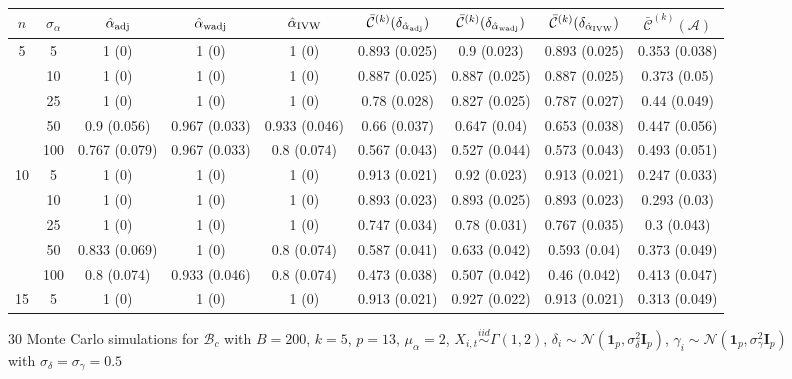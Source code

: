 \documentclass[10pt]{article}
\newcommand{\simiid}{\stackrel{iid}{\sim}} %
\def\normal#1#2{\mathcal{N}(#1,#2)} %
\def\mc#1{\mathcal{#1}} %
\theoremstyle{definition}
\begin{document}


\begin{sidewaysfigure}
\centering
\caption{30 Monte Carlo simulations for $\mc{B}_c$ with $B = 200$, $k = 5$, $p = 13$, $\mu_{\alpha}=2$, $X_{i,t} \simiid \Gamma(1,2)$, $\delta_i \sim \normal{\mathbf{1}_p}{\sigma^2_{\delta}\mathbf{I}_p}$, $\gamma_i \sim \normal{\mathbf{1}_p}{\sigma^2_{\gamma}\mathbf{I}_p}$ with $\sigma_{\delta}=\sigma_{\gamma}=0.5$}
\begin{tabular}{cc|ccc|cccc}
 $n$   & $\sigma_{\alpha}$ &  $\hat{\alpha}_{\rm adj}$  & $\hat{\alpha}_{\rm wadj}$ & $\hat{\alpha}_{\rm IVW}$  & $\bar{\mc{C}}^{(k)}(\delta_{\hat{\alpha}_{\rm adj}})$  & $\bar{\mc{C}}^{(k)}(\delta_{\hat{\alpha}_{\rm wadj}})$ & $\bar{\mc{C}}^{(k)}(\delta_{\hat{\alpha}_{\rm IVW}})$ &  $\bar{\mc{C}}^{(k)}(\mc{A})$ \\[.3cm]  
  \hline
  \multirow{5}{*}{5} & 5  & 1 (0) & 1 (0) & 1 (0) & 0.893 (0.025) & 0.9 (0.023) & 0.893 (0.025) & 0.353 (0.038) \\ 
  & 10  & 1 (0) & 1 (0) & 1 (0) & 0.887 (0.025) & 0.887 (0.025) & 0.887 (0.025) & 0.373 (0.05) \\ 
  & 25  & 1 (0) & 1 (0) & 1 (0) & 0.78 (0.028) & 0.827 (0.025) & 0.787 (0.027) & 0.44 (0.049) \\ 
  & 50  & 0.9 (0.056) & 0.967 (0.033) & 0.933 (0.046) & 0.66 (0.037) & 0.647 (0.04) & 0.653 (0.038) & 0.447 (0.056) \\ 
  & 100  & 0.767 (0.079) & 0.967 (0.033) & 0.8 (0.074) & 0.567 (0.043) & 0.527 (0.044) & 0.573 (0.043) & 0.493 (0.051) \\[.3cm]  
  \multirow{5}{*}{10} & 5  & 1 (0) & 1 (0) & 1 (0) & 0.913 (0.021) & 0.92 (0.023) & 0.913 (0.021) & 0.247 (0.033) \\ 
  & 10  & 1 (0) & 1 (0) & 1 (0) & 0.893 (0.023) & 0.893 (0.025) & 0.893 (0.023) & 0.293 (0.03) \\ 
  & 25  & 1 (0) & 1 (0) & 1 (0) & 0.747 (0.034) & 0.78 (0.031) & 0.767 (0.035) & 0.3 (0.043) \\ 
  & 50  & 0.833 (0.069) & 1 (0) & 0.8 (0.074) & 0.587 (0.041) & 0.633 (0.042) & 0.593 (0.04) & 0.373 (0.049) \\ 
  & 100  & 0.8 (0.074) & 0.933 (0.046) & 0.8 (0.074) & 0.473 (0.038) & 0.507 (0.042) & 0.46 (0.042) & 0.413 (0.047) \\[.3cm]  
  \multirow{5}{*}{15} & 5  & 1 (0) & 1 (0) & 1 (0) & 0.913 (0.021) & 0.927 (0.022) & 0.913 (0.021) & 0.313 (0.049) \\ 

\end{tabular}
\end{sidewaysfigure}
\end{document}
